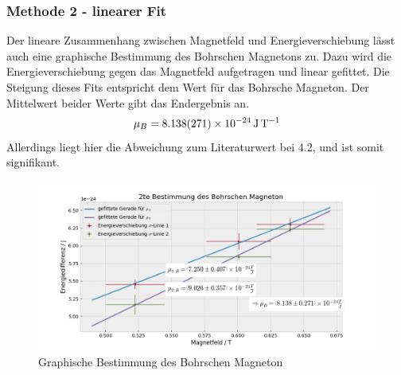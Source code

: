         \subsubsection{Methode 2 - linearer Fit}
        Der lineare Zusammenhang zwischen Magnetfeld und Energieverschiebung lässt auch eine graphische Bestimmung des Bohrschen Magnetons zu. Dazu wird die Energieverschiebung gegen das Magnetfeld aufgetragen und linear gefittet. Die Steigung dieses Fits entspricht dem Wert für das Bohrsche Magneton. Der Mittelwert beider Werte gibt das Endergebnis an.
        \begin{align}
          \mu_B = \SI{8.138+-0.271e-24}{\joule\per\tesla}
        \end{align}
        Allerdings liegt hier die Abweichung zum Literaturwert bei \SI{4.2}{\sigma}, und ist somit signifikant.
        \begin{figure}[H]
          \centering
          \hspace*{-1.5cm}\includegraphics[width=1.2\textwidth]{Auswertung/mu_B2}
          \caption{Graphische Bestimmung des Bohrschen Magneton}
          \label{plot::4}
        \end{figure}
